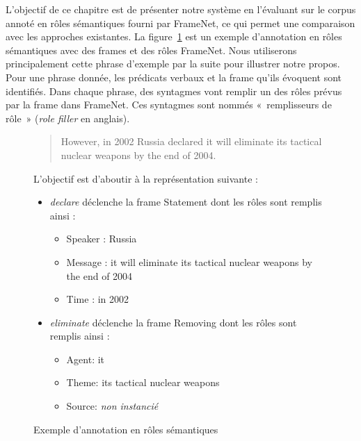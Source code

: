 L'objectif de ce chapitre est de présenter notre système en l'évaluant sur le
corpus annoté en rôles sémantiques fourni par FrameNet, ce qui permet une
comparaison avec les approches existantes. La figure~\ref{fig:srlrussia} est un
exemple d'annotation en rôles sémantiques avec des frames et des rôles
FrameNet. Nous utiliserons principalement cette phrase d'exemple par la suite
pour illustrer notre propos. Pour une phrase donnée, les prédicats verbaux et
la frame qu'ils évoquent sont identifiés. Dans chaque phrase, des syntagmes
vont remplir un des rôles prévus par la frame dans FrameNet. Ces syntagmes sont
nommés «~remplisseurs de rôle~» (\emph{role filler} en anglais).

\begin{figure}[ht]
    \begin{quote}
    However, in 2002 Russia declared it will eliminate its tactical nuclear weapons by the end of 2004.
    \end{quote}

    L'objectif est d'aboutir à la représentation suivante :

    \begin{itemize}
        \item \emph{declare} déclenche la frame Statement dont les rôles sont remplis ainsi :
        \begin{itemize}
            \item Speaker : Russia
            \item Message : it will eliminate its tactical nuclear weapons by the end of 2004
            \item Time : in 2002
        \end{itemize}
        \item \emph{eliminate} déclenche la frame Removing dont les rôles sont remplis ainsi :
        \begin{itemize}
            \item Agent: it
            \item Theme: its tactical nuclear weapons
            \item Source: \emph{non instancié}
        \end{itemize}
    \end{itemize}
    \caption{\label{fig:srlrussia}Exemple d'annotation en rôles sémantiques}
\end{figure}

